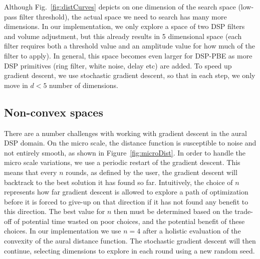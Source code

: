 Although Fig.~\ref{fig:distCurves} depicts on one dimension of the search space (low-pass filter threshold), the actual space we need to search has many more dimensions.
In our implementation, we only explore a space of two DSP filters and volume adjustment, but this already results in 5 dimensional space (each filter requires both a threshold value and an amplitude value for how much of the filter to apply).
In general, this space becomes even larger for DSP-PBE as more DSP primitives (ring filter, white noise, delay etc) are added.
To speed up gradient descent, we use stochastic gradient descent, so that in each step, we only move in $d<5$ number of dimensions.

\subsection{Non-convex spaces}
There are a number challenges with working with gradient descent in the aural DSP domain.
On the micro scale, the distance function is susceptible to noise and not entirely smooth, as shown in Figure~\ref{fig:microDist}.
In order to handle the micro scale variations, we use a periodic restart of the gradient descent.
This means that every $n$ rounds, as defined by the user, the gradient descent will backtrack to the best solution it has found so far.
Intuitively, the choice of $n$ represents how far gradient descent is allowed to explore a path of optimization before it is forced to give-up on that direction if it has not found any benefit to this direction.
The best value for $n$ then must be determined based on the trade-off of potential time wasted on poor choices, and the potential benefit of these choices.
In our implementation we use $n=4$ after a holistic evaluation of the convexity of the aural distance function.
The stochastic gradient descent will then continue, selecting dimensions to explore in each round using a new random seed.

